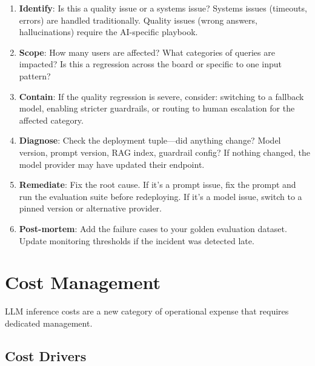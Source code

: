 \begin{enumerate}[leftmargin=*]
    \item \textbf{Identify}: Is this a quality issue or a systems issue? Systems issues (timeouts, errors) are handled traditionally. Quality issues (wrong answers, hallucinations) require the AI-specific playbook.
    \item \textbf{Scope}: How many users are affected? What categories of queries are impacted? Is this a regression across the board or specific to one input pattern?
    \item \textbf{Contain}: If the quality regression is severe, consider: switching to a fallback model, enabling stricter guardrails, or routing to human escalation for the affected category.
    \item \textbf{Diagnose}: Check the deployment tuple---did anything change? Model version, prompt version, RAG index, guardrail config? If nothing changed, the model provider may have updated their endpoint.
    \item \textbf{Remediate}: Fix the root cause. If it's a prompt issue, fix the prompt and run the evaluation suite before redeploying. If it's a model issue, switch to a pinned version or alternative provider.
    \item \textbf{Post-mortem}: Add the failure cases to your golden evaluation dataset. Update monitoring thresholds if the incident was detected late.
\end{enumerate}


\section{Cost Management}

LLM inference costs are a new category of operational expense that requires dedicated management.

\subsection{Cost Drivers}

